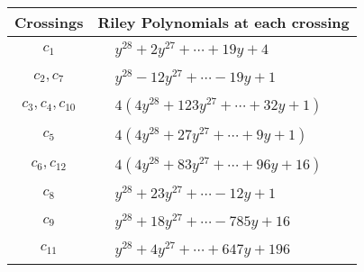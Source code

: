 \documentclass[1p]{elsarticle_modified}
\theoremstyle{definition}
\begin{document}
\begin{tabular}{m{50pt}|m{274pt}}
Crossings & \hspace{64pt}Riley Polynomials at each crossing \\
\hline $$\begin{aligned}c_{1}\end{aligned}$$&$\begin{aligned}
&y^{28}+2 y^{27}+\cdots+19 y+4
\end{aligned}$\\
\hline $$\begin{aligned}c_{2},c_{7}\end{aligned}$$&$\begin{aligned}
&y^{28}-12 y^{27}+\cdots-19 y+1
\end{aligned}$\\
\hline $$\begin{aligned}c_{3},c_{4},c_{10}\end{aligned}$$&$\begin{aligned}
&4(4 y^{28}+123 y^{27}+\cdots+32 y+1)
\end{aligned}$\\
\hline $$\begin{aligned}c_{5}\end{aligned}$$&$\begin{aligned}
&4(4 y^{28}+27 y^{27}+\cdots+9 y+1)
\end{aligned}$\\
\hline $$\begin{aligned}c_{6},c_{12}\end{aligned}$$&$\begin{aligned}
&4(4 y^{28}+83 y^{27}+\cdots+96 y+16)
\end{aligned}$\\
\hline $$\begin{aligned}c_{8}\end{aligned}$$&$\begin{aligned}
&y^{28}+23 y^{27}+\cdots-12 y+1
\end{aligned}$\\
\hline $$\begin{aligned}c_{9}\end{aligned}$$&$\begin{aligned}
&y^{28}+18 y^{27}+\cdots-785 y+16
\end{aligned}$\\
\hline $$\begin{aligned}c_{11}\end{aligned}$$&$\begin{aligned}
&y^{28}+4 y^{27}+\cdots+647 y+196
\end{aligned}$\\
\hline
\end{tabular}\\~\\
\end{document}
